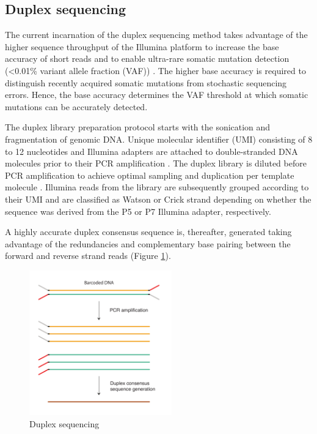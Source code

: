 \subsection{Duplex sequencing}

The current incarnation of the duplex sequencing method takes advantage of the higher sequence throughput of the Illumina platform to increase the base accuracy of short reads and to enable ultra-rare somatic mutation detection (<0.01\% variant allele fraction (VAF)) \cite{Schmitt2012-yr}. The higher base accuracy is required to distinguish recently acquired somatic mutations from stochastic sequencing errors. Hence, the base accuracy determines the VAF threshold at which somatic mutations can be accurately detected. 


The duplex library preparation protocol starts with the sonication and fragmentation of genomic DNA. Unique molecular identifier (UMI) consisting of 8 to 12 nucleotides and Illumina adapters are attached to double-stranded DNA molecules prior to their PCR amplification \cite{Schmitt2012-yr}. The duplex library is diluted before PCR amplification to achieve optimal sampling and duplication per template molecule \cite{Hoang2016-jx, Abascal2021-pk}. Illumina reads from the library are subsequently grouped according to their UMI and are classified as Watson or Crick strand depending on whether the sequence was derived from the P5 or P7 Illumina adapter, respectively. 

A highly accurate duplex consensus sequence is, thereafter, generated taking advantage of the redundancies and complementary base pairing between the forward and reverse strand reads (Figure \ref{figure:duplex-sequencing}). 

\begin{figure}[htbp!]
\caption{Duplex sequencing}
\label{figure:duplex-sequencing}
\begin{centering}
\includegraphics[width=0.55\textwidth]{Vector/duplex_sequencing.pdf}
\end{centering}
\end{figure}

